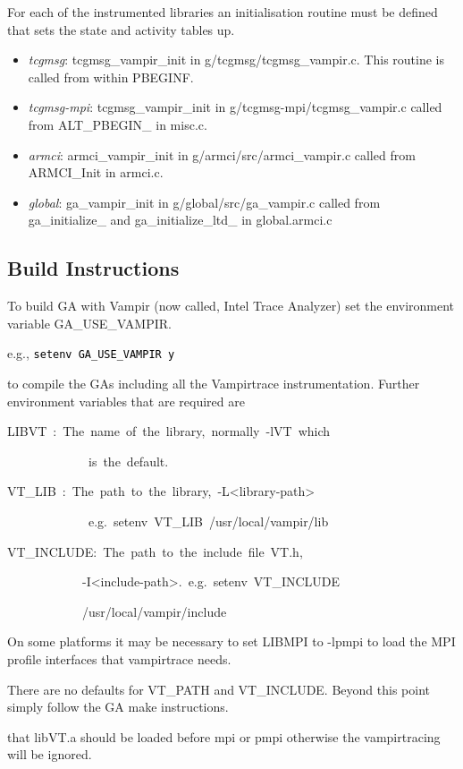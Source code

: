 For each of the instrumented libraries an initialisation routine must
be defined that sets the state and activity tables up.
\begin{itemize}
\item \emph{tcgmsg}: tcgmsg\_vampir\_init in g/tcgmsg/tcgmsg\_vampir.c.
This routine is called from within PBEGINF. 
\item \emph{tcgmsg-mpi}: tcgmsg\_vampir\_init in g/tcgmsg-mpi/tcgmsg\_vampir.c
called from ALT\_PBEGIN\_ in misc.c. 
\item \emph{armci}: armci\_vampir\_init in g/armci/src/armci\_vampir.c called
from ARMCI\_Init in armci.c. 
\item \emph{global}: ga\_vampir\_init in g/global/src/ga\_vampir.c called
from ga\_initialize\_ and ga\_initialize\_ltd\_ in global.armci.c
\end{itemize}

\subsection{Build Instructions }

To build GA with Vampir (now called, Intel Trace Analyzer) set the
environment variable GA\_USE\_VAMPIR.

e.g., \texttt{\textcolor{black}{setenv GA\_USE\_VAMPIR y}}

to compile the GAs including all the Vampirtrace instrumentation.
Further environment variables that are required are
\begin{lyxcode}
LIBVT~:~The~name~of~the~library,~normally~-lVT~which~

~~~~~~~~~~~~~is~the~default.~

VT\_LIB~:~The~path~to~the~library,~-L<library-path>~

~~~~~~~~~~~~~e.g.~setenv~VT\_LIB~/usr/local/vampir/lib~

VT\_INCLUDE:~The~path~to~the~include~file~VT.h,~

~~~~~~~~~~~~-I<include-path>.~e.g.~setenv~VT\_INCLUDE

~~~~~~~~~~~~/usr/local/vampir/include
\end{lyxcode}
On some platforms it may be necessary to set LIBMPI to -lpmpi to load
the MPI profile interfaces that vampirtrace needs.

There are no defaults for VT\_PATH and VT\_INCLUDE. Beyond this point
simply follow the GA make instructions.

that libVT.a should be loaded before mpi or pmpi otherwise
the vampirtracing will be ignored. 


